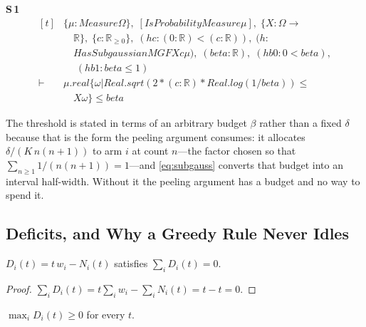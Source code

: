 \noindent\textbf{S\,1}\quad{}
{\footnotesize\[ \begin{aligned}[t]
&\{ \mu : \mathit{Measure} \Omega \},\; [\mathit{IsProbabilityMeasure} \mu ],\; \{ \mathit{X} : \Omega \to\\
&\quad \mathbb{R} \},\; \{ \mathit{c} : \mathbb{R}_{\geq0} \},\; (\mathit{hc} : (0:\mathbb{R} ) < (\mathit{c} : \mathbb{R} )),\; (\mathit{h} :\\
&\quad \mathit{HasSubgaussianMGF} \mathit{X} \mathit{c} \mu ),\; (\mathit{beta} : \mathbb{R} ),\; (\mathit{hb0} : 0 < \mathit{beta}),\\
&\quad \; (\mathit{hb1} : \mathit{beta} \leq 1)\\
\vdash\;&\mu .\mathit{real} \{ \omega | \mathit{Real}.\mathit{sqrt} (2 * (\mathit{c} : \mathbb{R} ) * \mathit{Real}.\mathit{log} (1 / \mathit{beta})) \leq\\
&\quad \mathit{X} \omega \} \leq \mathit{beta}
\end{aligned} \]}


The threshold is stated in terms of an arbitrary budget $\beta$ rather than a fixed
$\delta$ because that is the form the peeling argument consumes: it allocates
$\delta/(K\,n(n+1))$ to arm $i$ at count $n$---the factor chosen so that
$\sum_{n\ge1}1/(n(n+1))=1$---and \eqref{eq:subgauss} converts that budget into an interval
half-width. Without it the peeling argument has a budget and no way to spend it.

\subsection{Deficits, and Why a Greedy Rule Never Idles}
\label{sec:deficits}

\begin{lemma}
\label{lem:sumzero}
$D_{i}(t)=t\,w_{i}-N_{i}(t)$ satisfies $\sum_{i} D_{i}(t)=0$.
\end{lemma}

\begin{proof}
$\sum_{i}D_{i}(t)=t\sum_{i}w_{i}-\sum_{i}N_{i}(t)=t-t=0$.
\end{proof}


\begin{corollary}
\label{cor:deficient}
$\max_{i}D_{i}(t)\ge0$ for every $t$.
\end{corollary}

